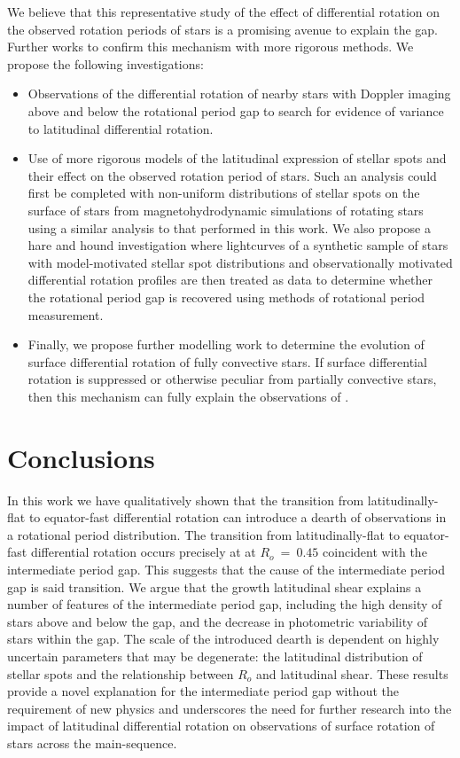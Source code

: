  
We believe that this representative study of the effect of differential rotation on the observed rotation periods of stars is a promising avenue to explain the gap.
Further works to confirm this mechanism with more rigorous methods.
We propose the following investigations:
\begin{itemize}
	\item Observations of the differential rotation of nearby stars with Doppler imaging above and below the rotational period gap to search for evidence of variance to latitudinal differential rotation.
	\item Use of more rigorous models of the latitudinal expression of stellar spots and their effect on the observed rotation period of stars. Such an analysis could first be completed with non-uniform distributions of stellar spots on the surface of stars from magnetohydrodynamic simulations of rotating stars using a similar analysis to that performed in this work. We also propose a hare and hound investigation where lightcurves of a synthetic sample of stars with model-motivated stellar spot distributions and observationally motivated differential rotation profiles are then treated as data to determine whether the rotational period gap is recovered using methods of rotational period measurement.
	\item Finally, we propose further modelling work to determine the evolution of surface differential rotation of fully convective stars. If surface differential rotation is suppressed or otherwise peculiar from partially convective stars, then this mechanism can fully explain the observations of \citet{lu_bridging_2022}.
\end{itemize}

\section{Conclusions}
\label{sec:conclusion}

In this work we have qualitatively shown that the transition from latitudinally-flat to equator-fast differential rotation can introduce a dearth of observations in a rotational period distribution.
The transition from latitudinally-flat to equator-fast differential rotation occurs precisely at at $R_o \ = \ 0.45$ coincident with the intermediate period gap.
This suggests that the cause of the intermediate period gap is said transition.
We argue that the growth latitudinal shear explains a number of features of the intermediate period gap, including the high density of stars above and below the gap, and the decrease in photometric variability of stars within the gap.
The scale of the introduced dearth is dependent on highly uncertain parameters that may be degenerate: the latitudinal distribution of stellar spots and the relationship between $R_o$ and latitudinal shear.
These results provide a novel explanation for the intermediate period gap without the requirement of new physics and underscores the need for further research into the impact of latitudinal differential rotation on observations of surface rotation of stars across the main-sequence.

